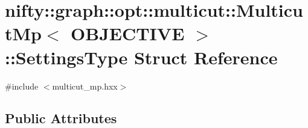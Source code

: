 \hypertarget{structnifty_1_1graph_1_1opt_1_1multicut_1_1MulticutMp_1_1SettingsType}{}\section{nifty\+:\+:graph\+:\+:opt\+:\+:multicut\+:\+:Multicut\+Mp$<$ O\+B\+J\+E\+C\+T\+I\+VE $>$\+:\+:Settings\+Type Struct Reference}
\label{structnifty_1_1graph_1_1opt_1_1multicut_1_1MulticutMp_1_1SettingsType}


{\ttfamily \#include $<$multicut\+\_\+mp.\+hxx$>$}

\subsection*{Public Attributes}
